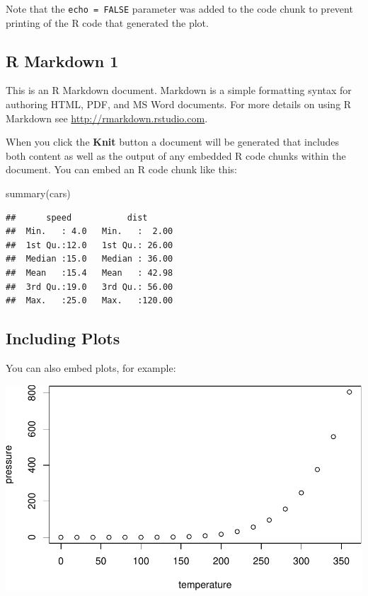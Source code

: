 \documentclass[
]{article}
\newenvironment{Shaded}{\begin{snugshade}}{\end{snugshade}}
\newcommand{\FunctionTok}[1]{\textcolor[rgb]{0.00,0.00,0.00}{#1}}
\newcommand{\NormalTok}[1]{#1}
\begin{document}
Note that the \texttt{echo\ =\ FALSE} parameter was added to the code chunk to prevent printing of the R code that generated the plot.

\hypertarget{r-markdown-1}{%
\subsection{R Markdown 1}\label{r-markdown-1}}

This is an R Markdown document. Markdown is a simple formatting syntax for authoring HTML, PDF, and MS Word documents. For more details on using R Markdown see \url{http://rmarkdown.rstudio.com}.

\protect\hypertarget{knitr-description}{}{When you click the \textbf{Knit} button a document will be generated that includes both content as well as the output of any embedded R code chunks within the document. You can embed an R code chunk like this:}

\begin{Shaded}
\begin{Highlighting}[]
\FunctionTok{summary}\NormalTok{(cars)}
\end{Highlighting}
\end{Shaded}

\begin{verbatim}
##      speed           dist       
##  Min.   : 4.0   Min.   :  2.00  
##  1st Qu.:12.0   1st Qu.: 26.00  
##  Median :15.0   Median : 36.00  
##  Mean   :15.4   Mean   : 42.98  
##  3rd Qu.:19.0   3rd Qu.: 56.00  
##  Max.   :25.0   Max.   :120.00
\end{verbatim}

\hypertarget{including-plots}{%
\subsection{Including Plots}\label{including-plots}}

You can also embed plots, for example:

\includegraphics{parent_files/figure-latex/pressure-1-1.pdf}
\end{document}
